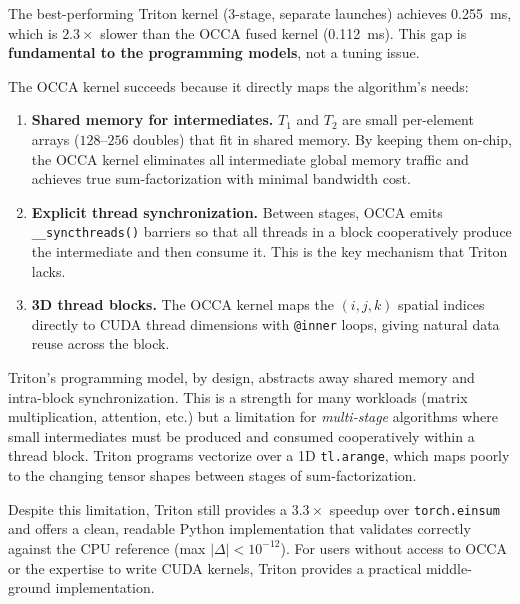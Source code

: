 \documentclass[11pt]{article}
\begin{document}
The best-performing Triton kernel (3-stage, separate launches) achieves
0.255~ms, which is $2.3\times$ slower than the OCCA fused kernel
(0.112~ms).  This gap is \textbf{fundamental to the programming models},
not a tuning issue.

The OCCA kernel succeeds because it directly maps the algorithm's needs:
\begin{enumerate}
  \item \textbf{Shared memory for intermediates.}  $T_1$ and $T_2$ are
    small per-element arrays ($128$--$256$ doubles) that fit in shared
    memory.  By keeping them on-chip, the OCCA kernel eliminates all
    intermediate global memory traffic and achieves true sum-factorization
    with minimal bandwidth cost.
  \item \textbf{Explicit thread synchronization.}  Between stages, OCCA
    emits \texttt{\_\_syncthreads()} barriers so that all threads in a
    block cooperatively produce the intermediate and then consume it.
    This is the key mechanism that Triton lacks.
  \item \textbf{3D thread blocks.}  The OCCA kernel maps the $(i,j,k)$
    spatial indices directly to CUDA thread dimensions with \texttt{@inner}
    loops, giving natural data reuse across the block.
\end{enumerate}

Triton's programming model, by design, abstracts away shared memory and
intra-block synchronization.  This is a strength for many workloads
(matrix multiplication, attention, etc.) but a limitation for
\emph{multi-stage} algorithms where small intermediates must be produced
and consumed cooperatively within a thread block.  Triton programs
vectorize over a 1D \texttt{tl.arange}, which maps poorly to the
changing tensor shapes between stages of sum-factorization.

Despite this limitation, Triton still provides a $3.3\times$ speedup
over \texttt{torch.einsum} and offers a clean, readable Python
implementation that validates correctly against the CPU reference
(max $|\Delta| < 10^{-12}$).  For users without access to OCCA or the
expertise to write CUDA kernels, Triton provides a practical
middle-ground implementation.
\end{document}
